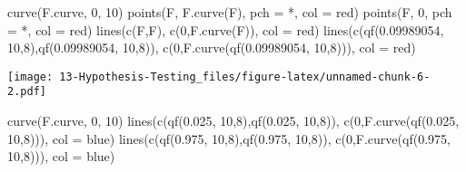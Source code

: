 \documentclass[
]{book}
\newenvironment{Shaded}{\begin{snugshade}}{\end{snugshade}}
\newcommand{\AttributeTok}[1]{\textcolor[rgb]{0.77,0.63,0.00}{#1}}
\newcommand{\DecValTok}[1]{\textcolor[rgb]{0.00,0.00,0.81}{#1}}
\newcommand{\FloatTok}[1]{\textcolor[rgb]{0.00,0.00,0.81}{#1}}
\newcommand{\FunctionTok}[1]{\textcolor[rgb]{0.00,0.00,0.00}{#1}}
\newcommand{\NormalTok}[1]{#1}
\newcommand{\StringTok}[1]{\textcolor[rgb]{0.31,0.60,0.02}{#1}}
\begin{document}
\begin{Shaded}
\begin{Highlighting}[]
\FunctionTok{curve}\NormalTok{(F.curve, }\DecValTok{0}\NormalTok{, }\DecValTok{10}\NormalTok{)}
\FunctionTok{points}\NormalTok{(F, }\FunctionTok{F.curve}\NormalTok{(F), }\AttributeTok{pch =} \StringTok{\textquotesingle{}*\textquotesingle{}}\NormalTok{, }\AttributeTok{col =} \StringTok{\textquotesingle{}red\textquotesingle{}}\NormalTok{)}
\FunctionTok{points}\NormalTok{(F, }\DecValTok{0}\NormalTok{, }\AttributeTok{pch =} \StringTok{\textquotesingle{}*\textquotesingle{}}\NormalTok{, }\AttributeTok{col =} \StringTok{\textquotesingle{}red\textquotesingle{}}\NormalTok{)}
\FunctionTok{lines}\NormalTok{(}\FunctionTok{c}\NormalTok{(F,F), }\FunctionTok{c}\NormalTok{(}\DecValTok{0}\NormalTok{,}\FunctionTok{F.curve}\NormalTok{(F)), }\AttributeTok{col =} \StringTok{\textquotesingle{}red\textquotesingle{}}\NormalTok{)}
\FunctionTok{lines}\NormalTok{(}\FunctionTok{c}\NormalTok{(}\FunctionTok{qf}\NormalTok{(}\FloatTok{0.09989054}\NormalTok{, }\DecValTok{10}\NormalTok{,}\DecValTok{8}\NormalTok{),}\FunctionTok{qf}\NormalTok{(}\FloatTok{0.09989054}\NormalTok{, }\DecValTok{10}\NormalTok{,}\DecValTok{8}\NormalTok{)), }\FunctionTok{c}\NormalTok{(}\DecValTok{0}\NormalTok{,}\FunctionTok{F.curve}\NormalTok{(}\FunctionTok{qf}\NormalTok{(}\FloatTok{0.09989054}\NormalTok{, }\DecValTok{10}\NormalTok{,}\DecValTok{8}\NormalTok{))), }\AttributeTok{col =} \StringTok{\textquotesingle{}red\textquotesingle{}}\NormalTok{)}
\end{Highlighting}
\end{Shaded}

\texttt{[image: 13-Hypothesis-Testing\_files/figure-latex/unnamed-chunk-6-2.pdf]}

\begin{Shaded}
\begin{Highlighting}[]
\FunctionTok{curve}\NormalTok{(F.curve, }\DecValTok{0}\NormalTok{, }\DecValTok{10}\NormalTok{)}
\FunctionTok{lines}\NormalTok{(}\FunctionTok{c}\NormalTok{(}\FunctionTok{qf}\NormalTok{(}\FloatTok{0.025}\NormalTok{, }\DecValTok{10}\NormalTok{,}\DecValTok{8}\NormalTok{),}\FunctionTok{qf}\NormalTok{(}\FloatTok{0.025}\NormalTok{, }\DecValTok{10}\NormalTok{,}\DecValTok{8}\NormalTok{)), }\FunctionTok{c}\NormalTok{(}\DecValTok{0}\NormalTok{,}\FunctionTok{F.curve}\NormalTok{(}\FunctionTok{qf}\NormalTok{(}\FloatTok{0.025}\NormalTok{, }\DecValTok{10}\NormalTok{,}\DecValTok{8}\NormalTok{))), }\AttributeTok{col =} \StringTok{\textquotesingle{}blue\textquotesingle{}}\NormalTok{)}
\FunctionTok{lines}\NormalTok{(}\FunctionTok{c}\NormalTok{(}\FunctionTok{qf}\NormalTok{(}\FloatTok{0.975}\NormalTok{, }\DecValTok{10}\NormalTok{,}\DecValTok{8}\NormalTok{),}\FunctionTok{qf}\NormalTok{(}\FloatTok{0.975}\NormalTok{, }\DecValTok{10}\NormalTok{,}\DecValTok{8}\NormalTok{)), }\FunctionTok{c}\NormalTok{(}\DecValTok{0}\NormalTok{,}\FunctionTok{F.curve}\NormalTok{(}\FunctionTok{qf}\NormalTok{(}\FloatTok{0.975}\NormalTok{, }\DecValTok{10}\NormalTok{,}\DecValTok{8}\NormalTok{))), }\AttributeTok{col =} \StringTok{\textquotesingle{}blue\textquotesingle{}}\NormalTok{)}
\end{Highlighting}
\end{Shaded}
\end{document}
